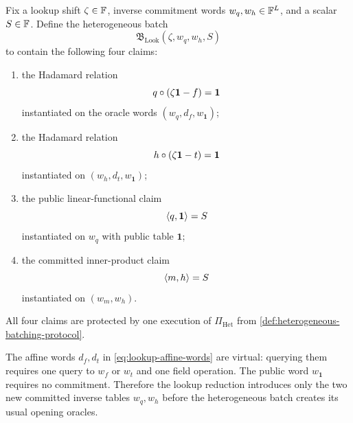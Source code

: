 \begin{definition}
\label{def:lookup-sub-batch}
Fix a lookup shift $\zeta\in\mathbb{F}$, inverse commitment words $w_q,w_h\in\mathbb{F}^L$, and a scalar $S\in\mathbb{F}$.  Define the heterogeneous batch
\begin{equation}
  \mathfrak B_{\mathrm{Look}}(\zeta,w_q,w_h,S)
  \label{eq:lookup-sub-batch}
\end{equation}
to contain the following four claims:
\begin{enumerate}[label=(\roman*),leftmargin=*]
  \item the Hadamard relation
  \begin{equation}
    q\circ(\zeta\mathbf1-f)=\mathbf1
    \label{eq:lookup-batch-had-f}
  \end{equation}
  instantiated on the oracle words $(w_q,d_f,w_{\mathbf1})$;

  \item the Hadamard relation
  \begin{equation}
    h\circ(\zeta\mathbf1-t)=\mathbf1
    \label{eq:lookup-batch-had-t}
  \end{equation}
  instantiated on $(w_h,d_t,w_{\mathbf1})$;

  \item the public linear-functional claim
  \begin{equation}
    \left\langle q,\mathbf1\right\rangle=S
    \label{eq:lookup-batch-linear}
  \end{equation}
  instantiated on $w_q$ with public table $\mathbf1$;

  \item the committed inner-product claim
  \begin{equation}
    \left\langle m,h\right\rangle=S
    \label{eq:lookup-batch-ip}
  \end{equation}
  instantiated on $(w_m,w_h)$.
\end{enumerate}
All four claims are protected by one execution of $\Pi_{\mathrm{Het}}$ from \cref{def:heterogeneous-batching-protocol}.
\end{definition}

The affine words $d_f,d_t$ in \eqref{eq:lookup-affine-words} are virtual: querying them requires one query to $w_f$ or $w_t$ and one field operation.  The public word $w_{\mathbf1}$ requires no commitment.  Therefore the lookup reduction introduces only the two new committed inverse tables $w_q,w_h$ before the heterogeneous batch creates its usual opening oracles.

